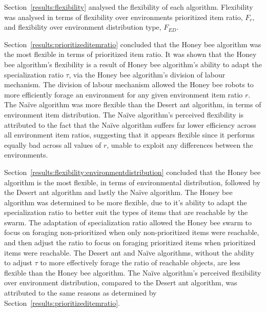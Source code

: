 Section~\ref{results:flexibility} analysed the flexibility of each algorithm. Flexibility was analysed in terms of flexibility over environments prioritized item ratio, $F_r$, and flexibility over environment distribution type, $F_{ED}$. 

Section~\ref{results:prioritizeditemratio} concluded that the Honey bee algorithm was the most flexible in terms of prioritized item ratio. It was shown that the Honey bee algorithm's flexibility is a result of Honey bee algorithm's ability to adapt the specialization ratio $\tau$, via the Honey bee algorithm's division of labour mechanism. The division of labour mechanism allowed the Honey bee robots to more efficiently forage an environment for any given environment item ratio $r$. The Na\"ive algorithm was more flexible than the Desert ant algorithm, in terms of environment item distribution. The Na\"ive algorithm's perceived flexibility is attributed to the fact that the Na\"ive algorithm suffers far lower efficiency across all environment item ratios, suggesting that it appears flexible since it performs equally bad across all values of $r$, unable to exploit any differences between the environments. 

Section~\ref{results:flexibility:environmentdistribution} concluded that the Honey bee algorithm is the most flexible, in terms of environmental distribution, followed by the Desert ant algorithm and lastly the Na\"ive algorithm. The Honey bee algorithm was determined to be more flexible, due to it's ability to adapt the specialization ratio to better suit the types of items that are reachable by the swarm. The adaptation of specialization ratio allowed the Honey bee swarm to focus on foraging non-prioritized when only non-prioritized items were reachable, and then adjust the ratio to focus on foraging prioritized items when prioritized items were reachable. The Desert ant and Na\"ive algorithms, without the ability to adjust $\tau$ to more effectively forage the ratio of reachable objects, are less flexible than the Honey bee algorithm.
  The Na\"ive algorithm's perceived flexibility over environment distribution, compared to the Desert ant algorithm, was attributed to the same reasons as determined by Section~\ref{results:prioritizeditemratio}. 
  
